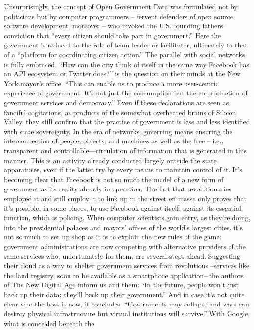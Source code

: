 \documentclass[landscape,twocolumn,letterpaper]{article}
\begin{document}
Unsurprisingly, the concept of Open Government Data was formulated not
by politicians but by computer programmers – fervent defenders of open
source software development, moreover – who invoked the U.S. founding
fathers’ conviction that “every citizen should take part in
government.” Here the government is reduced to the role of team leader
or facilitator, ultimately to that of a “platform for coordinating
citizen action.”  The parallel with social networks is fully
embraced. “How can the city think of itself in the same way Facebook
has an API ecosystem or Twitter does?” is the question on their minds
at the New York mayor’s office. “This can enable us to produce a more
user-centric experience of government. It’s not just the consumption
but the co-production of government services and democracy.” Even if
these declarations are seen as fanciful cogitations, as products of
the somewhat overheated brains of Silicon Valley, they still confirm
that the practice of government is less and less identified with state
sovereignty. In the era of networks, governing means ensuring the
interconnection of people, objects, and machines as well as the free –
i.e., transparent and controllable—circulation of information that is
generated in this manner. This is an activity already conducted
largely outside the state apparatuses, even if the latter try by every
means to maintain control of it. It’s becoming clear that Facebook is
not so much the model of a new form of government as its reality
already in operation. The fact that revolutionaries employed it and
still employ it to link up in the street en masse only proves that
it’s possible, in some places, to use Facebook against itself, against
its essential function, which is policing. When computer scientists
gain entry, as they’re doing, into the presidential palaces and
mayors’ offices of the world’s largest cities, it’s not so much to set
up shop as it is to explain the new rules of the game: government
administrations are now competing with alternative providers of the
same services who, unfortunately for them, are several steps
ahead. Suggesting their cloud as a way to shelter government services
from revolutions –services like the land registry, soon to be
available as a smartphone application– the authors of The New Digital
Age inform us and them: “In the future, people won’t just back up
their data; they’ll back up their government.” And in case it’s not
quite clear who the boss is now, it concludes: “Governments may
collapse and wars can destroy physical infrastructure but virtual
institutions will survive.” With Google, what is concealed beneath the
\end{document}
